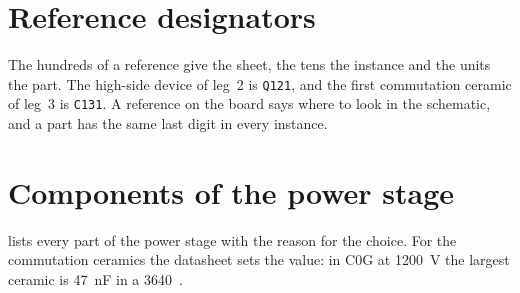 \section{Reference designators}

The hundreds of a reference give the sheet, the tens the instance and the
units the part. The high-side device of leg~2 is \texttt{Q121}, and the first
commutation ceramic of leg~3 is \texttt{C131}. A reference on the board says
where to look in the schematic, and a part has the same last digit in every
instance.

\section{Components of the power stage}

 lists every part of the power stage with the reason for the
choice. For the commutation ceramics the datasheet sets the value: in C0G
at \SI{1200}{\volt} the largest ceramic is \SI{47}{\nano\farad} in a
3640~\cite{kemet_kclink}.

